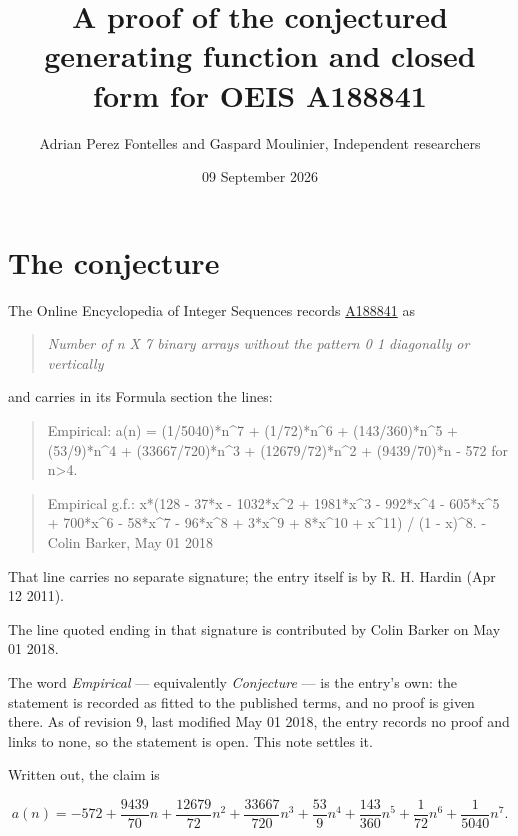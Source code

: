 \documentclass[11pt]{article}
\title{A proof of the conjectured generating function and closed form for OEIS A188841}
\author{Adrian Perez Fontelles and Gaspard Moulinier, Independent researchers}
\date{09 September 2026}
\theoremstyle{definition}
\begin{document}
\maketitle
\section{The conjecture}

The Online Encyclopedia of Integer Sequences records \href{https://oeis.org/A188841}{A188841} as

\begin{quote}\itshape Number of n X 7 binary arrays without the pattern 0 1 diagonally or vertically\end{quote}

and carries in its Formula section the lines:

\begin{quote}\ttfamily Empirical: a(n) = (1/5040)*n\textasciicircum{}7 + (1/72)*n\textasciicircum{}6 + (143/360)*n\textasciicircum{}5 + (53/9)*n\textasciicircum{}4 + (33667/720)*n\textasciicircum{}3 + (12679/72)*n\textasciicircum{}2 + (9439/70)*n - 572 for n>4.\end{quote}

\begin{quote}\ttfamily Empirical g.f.: x*(128 - 37*x - 1032*x\textasciicircum{}2 + 1981*x\textasciicircum{}3 - 992*x\textasciicircum{}4 - 605*x\textasciicircum{}5 + 700*x\textasciicircum{}6 - 58*x\textasciicircum{}7 - 96*x\textasciicircum{}8 + 3*x\textasciicircum{}9 + 8*x\textasciicircum{}10 + x\textasciicircum{}11) / (1 - x)\textasciicircum{}8. - Colin Barker, May 01 2018\end{quote}

That line carries no separate signature; the entry itself is by R. H. Hardin (Apr 12 2011).

The line quoted ending in that signature is contributed by Colin Barker on May 01 2018.

The word {\itshape Empirical} --- equivalently {\itshape Conjecture} --- is the entry's own: the statement is recorded as fitted to the published terms, and no proof is given there. As of revision 9, last modified May 01 2018, the entry records no proof and links to none, so the statement is open. This note settles it.

Written out, the claim is

\[a(n) = -572 + \frac{9439}{70}n + \frac{12679}{72}n^{2} + \frac{33667}{720}n^{3} + \frac{53}{9}n^{4} + \frac{143}{360}n^{5} + \frac{1}{72}n^{6} + \frac{1}{5040}n^{7}.\]
\end{document}
